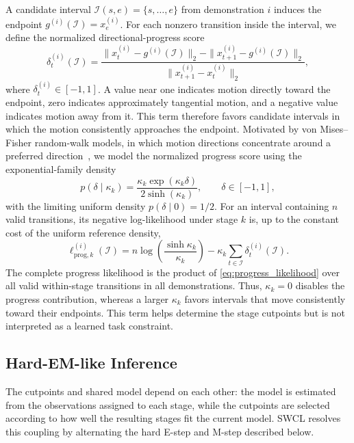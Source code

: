 A candidate interval $\mathcal{I}(s,e)=\{s,\ldots,e\}$ from demonstration $i$ induces the endpoint $g^{(i)}(\mathcal{I})=x_e^{(i)}$. For each nonzero transition inside the interval, we define the normalized directional-progress score
\begin{equation}
\delta_t^{(i)}(\mathcal{I})
=
\frac{
\|x_t^{(i)}-g^{(i)}(\mathcal{I})\|_2
-
\|x_{t+1}^{(i)}-g^{(i)}(\mathcal{I})\|_2
}
{\|x_{t+1}^{(i)}-x_t^{(i)}\|_2},
\label{eq:directional_progress}
\end{equation}
where $\delta_t^{(i)}\in[-1,1]$. A value near one indicates motion directly toward the endpoint, zero indicates approximately tangential motion, and a negative value indicates motion away from it. This term therefore favors candidate intervals in which the motion consistently approaches the endpoint. Motivated by von Mises--Fisher random-walk models, in which motion directions concentrate around a preferred direction~\cite{gatto2017saddlepoint}, we model the normalized progress score using the exponential-family density
\begin{equation}
p(\delta\mid\kappa_k)
=
\frac{\kappa_k\exp(\kappa_k\delta)}{2\sinh(\kappa_k)},
\qquad
\delta\in[-1,1],
\label{eq:progress_likelihood}
\end{equation}
with the limiting uniform density $p(\delta\mid0)=1/2$. For an interval containing $n$ valid transitions, its negative log-likelihood under stage $k$ is, up to the constant cost of the uniform reference density,
\begin{equation}
\ell_{\mathrm{prog},k}^{(i)}(\mathcal{I})
=
n\log\!\left(\frac{\sinh\kappa_k}{\kappa_k}\right)
-
\kappa_k
\sum_{t\in\mathcal{I}}
\delta_t^{(i)}(\mathcal{I}).
\label{eq:progress_interval_nll}
\end{equation}
The complete progress likelihood is the product of \eqref{eq:progress_likelihood} over all valid within-stage transitions in all demonstrations. Thus, $\kappa_k=0$ disables the progress contribution, whereas a larger $\kappa_k$ favors intervals that move consistently toward their endpoints. This term helps determine the stage cutpoints but is not interpreted as a learned task constraint.

\subsection{Hard-EM-like Inference}
\label{sec:hard_em_inference}

The cutpoints and shared model depend on each other: the model is estimated from the observations assigned to each stage, while the cutpoints are selected according to how well the resulting stages fit the current model. SWCL resolves this coupling by alternating the hard E-step and M-step described below.

